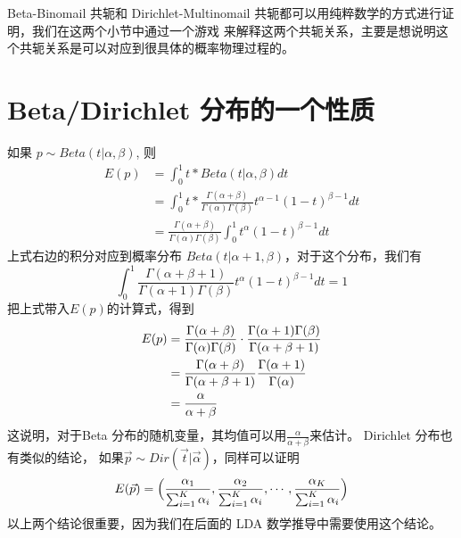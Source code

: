 Beta-Binomail 共轭和 Dirichlet-Multinomail 共轭都可以用纯粹数学的方式进行证明，我们在这两个小节中通过一个游戏
来解释这两个共轭关系，主要是想说明这个共轭关系是可以对应到很具体的概率物理过程的。

\section{Beta/Dirichlet 分布的一个性质}

如果 $p\sim Beta(t|\alpha,\beta)$, 则
\begin{align*}
E(p) & = \int_0^1 t*Beta(t|\alpha,\beta)dt \\
& =  \int_0^1 t* \frac{\Gamma(\alpha+\beta)}{\Gamma(\alpha)\Gamma(\beta)} t^{\alpha-1}(1-t)^{\beta-1}dt \\
& = \frac{\Gamma(\alpha+\beta)}{\Gamma(\alpha)\Gamma(\beta)}  \int_0^1 t^{\alpha}(1-t)^{\beta-1}dt
\end{align*}
上式右边的积分对应到概率分布 $Beta(t|\alpha+1,\beta)$，对于这个分布，我们有
$$
\int_0^1 \frac{\Gamma(\alpha+\beta+1)}{\Gamma(\alpha+1)\Gamma(\beta)} t^{\alpha}(1-t)^{\beta-1}dt = 1
$$
把上式带入$E(p)$的计算式，得到
\begin{align}
E(p) & = \frac{\Gamma(\alpha+\beta)}{\Gamma(\alpha)\Gamma(\beta)}
\cdot \frac{\Gamma(\alpha+1)\Gamma(\beta)}{\Gamma(\alpha+\beta+1)} \notag \\
& = \frac{\Gamma(\alpha+\beta)}{\Gamma(\alpha+\beta+1)}\frac{\Gamma(\alpha+1)}{\Gamma(\alpha)} \notag \\
& = \frac{\alpha}{\alpha+\beta}
\label{beta-mean}
\end{align}
这说明，对于Beta 分布的随机变量，其均值可以用$\frac{\alpha}{\alpha+\beta}$来估计。
Dirichlet 分布也有类似的结论，
如果$\vec{p} \sim Dir(\vec{t}|\vec{\alpha})$，同样可以证明
\begin{equation}
 E(\vec{p}) = \Bigl(\frac{\alpha_1}{\sum_{i=1}^K\alpha_i},\frac{\alpha_2}{\sum_{i=1}^K\alpha_i},\cdots, \frac{\alpha_K}{\sum_{i=1}^K\alpha_i} \Bigr)
 \label{dir-mean}
\end{equation}
以上两个结论很重要，因为我们在后面的 LDA 数学推导中需要使用这个结论。


